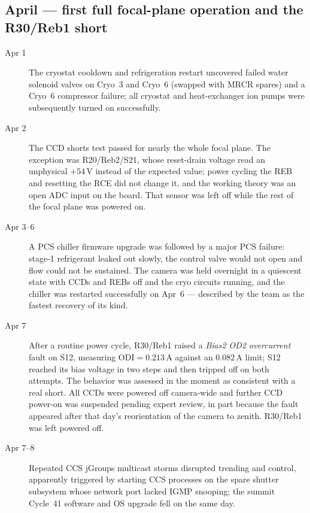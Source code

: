 \subsection{April --- first full focal-plane operation and the R30/Reb1 short}
\begin{description}
\item[Apr 1] The cryostat cooldown and refrigeration restart uncovered
  failed water solenoid valves on Cryo~3 and Cryo~6 (swapped with MRCR
  spares) and a Cryo~6 compressor failure; all cryostat and heat-exchanger
  ion pumps were subsequently turned on successfully.

\item[Apr 2] The CCD shorts test passed for nearly the whole focal
  plane.  The exception was R20/Reb2/S21, whose reset-drain voltage
  read an unphysical $+54$\,V instead of the expected value; power
  cycling the REB and resetting the RCE did not change it, and the
  working theory was an open ADC input on the board.  That sensor was
  left off while the rest of the focal plane was powered on.

\item[Apr 3--6] A PCS chiller firmware upgrade was followed by a major
  PCS failure: stage-1 refrigerant leaked out slowly, the control
  valve would not open and flow could not be sustained.  The camera
  was held overnight in a quiescent state with CCDs and REBs off and
  the cryo circuits running, and the chiller was restarted
  successfully on Apr~6 --- described by the team as the fastest
  recovery of its kind.

\item[Apr 7] After a routine power cycle, R30/Reb1 raised a
  \emph{Bias2 OD2 overcurrent} fault on S12, measuring
  $\mathrm{ODI}=0.213$\,A against an $0.082$\,A limit; S12 reached its
  bias voltage in two steps and then tripped off on both attempts.
  The behavior was assessed in the moment as consistent with a real
  short.  All CCDs were powered off camera-wide and further CCD
  power-on was suspended pending expert review, in part because the
  fault appeared after that day's reorientation of the camera to
  zenith.  R30/Reb1 was left powered off.

\item[Apr 7--8] Repeated CCS jGroups multicast storms disrupted
  trending and control, apparently triggered by starting CCS processes
  on the spare shutter subsystem whose network port lacked IGMP
  snooping; the summit Cycle~41 software and OS upgrade fell on the
  same day.


\end{description}
